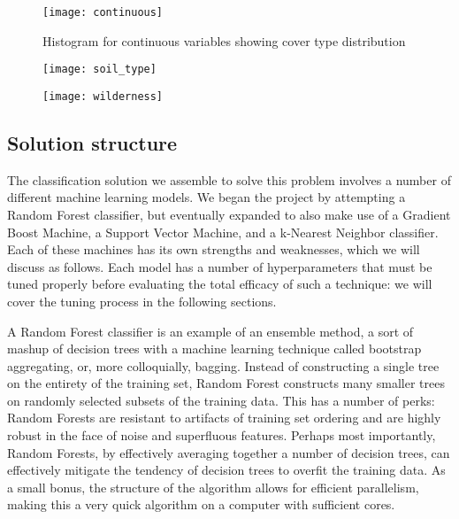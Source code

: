 \begin{figure*}
\centering
\texttt{[image: continuous]}
 \caption{Histogram for continuous variables showing cover type distribution}
 \label{fig:continuous_features}
\end{figure*}

\begin{figure*}
\centering
\begin{minipage}{.5\textwidth}
  \centering
  \texttt{[image: soil\_type]}
  \label{fig:soil}
\end{minipage}%
\begin{minipage}{.5\textwidth}
  \centering
  \texttt{[image: wilderness]}
  \label{fig:wilderness}
\end{minipage}
\end{figure*}



\subsection{Solution structure}
The classification solution we assemble to solve this problem involves 
a number of different machine learning models.  We began the project by 
attempting a Random Forest classifier, but eventually expanded to also 
make use of a Gradient Boost Machine, a Support Vector Machine, and a 
k-Nearest Neighbor classifier.  Each of these machines has its own 
strengths and weaknesses, which we will discuss as follows.  Each model 
has a number of hyperparameters that must be tuned properly before 
evaluating the total efficacy of such a technique: we will cover the 
tuning process in the following sections.

A Random Forest classifier\cite{breiman2001random} is an example of an 
ensemble method, a sort of mashup of decision trees with a machine 
learning technique called bootstrap aggregating, or, more colloquially, 
bagging\cite{bagging}.  Instead of constructing a single tree on the 
entirety of the training set, Random Forest constructs many smaller 
trees on randomly selected subsets of the training data.  This has a 
number of perks: Random Forests are resistant to artifacts of training 
set ordering and are highly robust in the face of noise and superfluous 
features.  Perhaps most importantly, Random Forests, by effectively 
averaging together a number of decision trees, can effectively mitigate 
the tendency of decision trees to overfit the training data.  As a 
small bonus, the structure of the algorithm allows for efficient 
parallelism, making this a very quick algorithm on a computer with 
sufficient cores.


